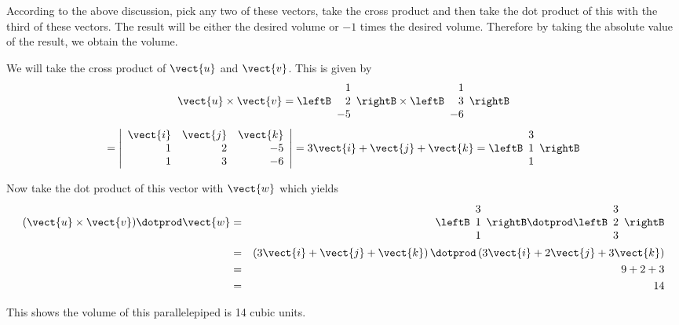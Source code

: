 \begin{solution}
According to the above discussion, pick any two of these vectors, take the cross
product and then take the dot product of this with the third of these
vectors. The result will be either the desired volume or $-1$ times the desired
volume. Therefore by taking the absolute value of the result, we obtain the volume. 

We will take the cross product of $\vect{u}$ and $\vect{v}$. 
This is given by 
\begin{equation*}
\vect{u} \times \vect{v}
=
\leftB
\begin{array}{r}
1 \\
2 \\
-5
\end{array}
\rightB
\times
\leftB
\begin{array}{r}
1 \\
3 \\
-6
\end{array}
\rightB
\end{equation*}
\begin{equation*}
=\left\vert
\begin{array}{rrr}
\vect{i} & \vect{j} & \vect{k} \\
1 & 2 & -5 \\
1 & 3 & -6
\end{array}
\right\vert = 3\vect{i}+\vect{j}+\vect{k}
=
\leftB
\begin{array}{r}
3 \\
1 \\
1
\end{array}
\rightB 
\end{equation*}

Now take the dot product of this vector with $\vect{w}$ which yields
\begin{eqnarray*}
(\vect{u} \times \vect{v}) \dotprod \vect{w}
&=&
\leftB
\begin{array}{r}
3 \\
1 \\
1
\end{array}
\rightB
\dotprod
\leftB
\begin{array}{r}
3 \\
2 \\
3 
\end{array}
\rightB \\
&=&\left( 3\vect{i}+\vect{j}+\vect{k}\right) \dotprod
 \left( 3\vect{i}+2\vect{j}+3\vect{k}\right) \\
&=&9+2+3 \\
&=&14
\end{eqnarray*}

This shows the volume of this parallelepiped is 14 cubic units.
\end{solution}

